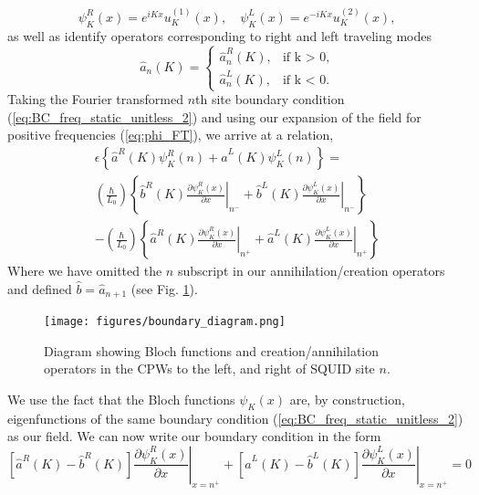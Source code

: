 \begin{equation}\label{eq:bloch_waves}
    \psi_{K}^R (x) =e^{iKx} u_{K}^{(1)}(x), \hspace{12pt}  \psi_{K}^L(x) =e^{-iKx} u_{K}^{(2)}(x),
\end{equation}
%
as well as identify operators corresponding to right and left traveling modes
\begin{equation}
    \hat{a}_n(K) = 
    \begin{cases}
    \hat{a}_n^R(K), &\text{if k > 0,}\\
    \hat{a}_n^L(K), &\text{if k < 0.}
    \end{cases}
\end{equation}
%
Taking the Fourier transformed $n$th site boundary condition (\ref{eq:BC_freq_static_unitless_2}) and using our expansion of the field for positive frequencies (\ref{eq:phi_FT}), we arrive at a relation,
%
\begin{equation}\label{eq:BC_static_1}
\begin{split}
    \epsilon \left\lbrace\hat{a}^R(K) \psi^R_K(n) + \hat{a}^L(K) \psi^L_K(n) \right\rbrace =
    \\[2mm]
    \left(\frac{\hbar}{L_0}\right) 
    \left\lbrace\hat{b}^R(K) \left.\frac{\partial \psi^R_K(x)}{\partial x}\right|_{n^-} +\hat{b}^L(K) \left.\frac{\partial \psi^L_K(x)}{\partial x}\right|_{n^-}\right\rbrace
    \\[2mm]
    -
    \left(\frac{\hbar}{L_0}\right) 
    \left\lbrace\hat{a}^R(K) \left.\frac{\partial \psi^R_K(x)}{\partial x}\right|_{n^+} +\hat{a}^L(K) \left.\frac{\partial \psi^L_K(x)}{\partial x}\right|_{n^+} \right\rbrace
\end{split}
\end{equation}
%
Where we have omitted the $n$ subscript in our annihilation/creation operators and defined $\hat{b} = \hat{a}_{n+1}$ (see Fig. \ref{fig:boundary_diagram}).
%
\begin{figure}[h]\label{fig:boundary_diagram}
    \centering
    \texttt{[image: figures/boundary\_diagram.png]}
    \caption{Diagram showing Bloch functions and creation/annihilation operators in the CPWs to the left, and right of SQUID site $n$.}
\end{figure}
%
We use the fact that the Bloch functions $\psi_K(x)$ are, by construction, eigenfunctions of the same boundary condition (\ref{eq:BC_freq_static_unitless_2}) as our field. We can now write our boundary condition in the form
%
\begin{equation}
    \left[\hat{a}^R(K) - \hat{b}^R(K)\right]\left.\frac{\partial \psi^R_K(x)}{\partial x}\right|_{x=n^+}
    +
    \left[\hat{a}^L(K) - \hat{b}^L(K)\right]\left.\frac{\partial \psi^L_K(x)}{\partial x}\right|_{x=n^+} = 0 
\end{equation}
